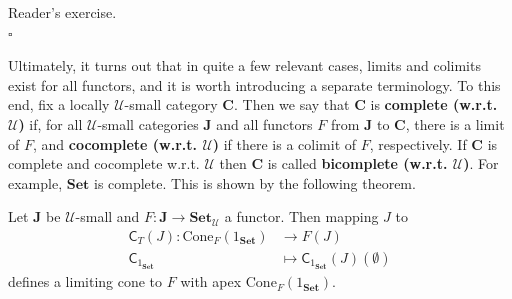 \begin{prf}
Reader's exercise.
\\
\phantom{proven}
\hfill
$\square$
\end{prf}
Ultimately, it turns out that in quite a few relevant cases, limits and colimits exist for all functors, and it is worth introducing a separate terminology.
To this end, fix a locally $\mathcal{U}$-small category $\mathbf{C}$.
Then we say that $\mathbf{C}$ is \textbf{complete (w.r.t. $\mathcal{U}$)} if, for all $\mathcal{U}$-small categories $\mathbf{J}$ and all functors $F$ from $\mathbf{J}$ to $\mathbf{C}$, there is a limit of $F$, and \textbf{cocomplete (w.r.t. $\mathcal{U}$)} if there is a colimit of $F$, respectively.
If $\mathbf{C}$ is complete and cocomplete w.r.t. $\mathcal{U}$ then $\mathbf{C}$ is called \textbf{bicomplete (w.r.t. $\mathcal{U}$)}.
For example, $\mathbf{Set}$ is complete.
This is shown by the following theorem.
\\
\begin{thm}
\label{thm:setcomplete}
Let $\mathbf{J}$ be $\mathcal{U}$-small and $F \colon \mathbf{J} \rightarrow \mathbf{Set}_{\mathcal{U}}$ a functor.
Then mapping $J$ to
\begin{align*}
  \mathsf{C}_{T}(J)
  \colon
  \mathrm{Cone}_{F}(1_{\mathbf{Set}})
  &\rightarrow
  F(J)
  \\
  \mathsf{C}_{1_{\mathbf{Set}}}
  &\mapsto
  \mathsf{C}_{1_{\mathbf{Set}}}(J)(\emptyset)
\end{align*}
defines a limiting cone to $F$ with apex $\mathrm{Cone}_{F}(1_{\mathbf{Set}})$.
\end{thm}
